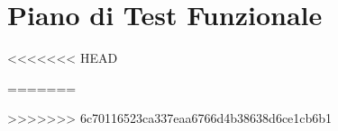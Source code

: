 \section{Piano di Test Funzionale}
\label{sec:piano_di_test_funzionale}


<<<<<<< HEAD
 
=======



>>>>>>> 6c70116523ca337eaa6766d4b38638d6ce1cb6b1

